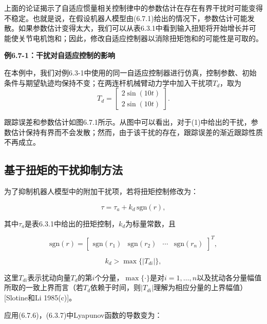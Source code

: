 \documentclass[12pt,a4paper]{ctexart}
\begin{document}
上面的论证揭示了自适应惯量相关控制律中的参数估计在存在有界干扰时可能变得不稳定。也就是说，在假设机器人模型由(6.7.1)给出的情况下，参数估计可能发散。如果参数估计变得太大，我们可以从表6.3.1中看到输入扭矩将开始增长并可能使关节电机饱和；因此，修改自适应控制器以消除扭矩饱和的可能性是可取的。

\textbf{例6.7-1：干扰对自适应控制的影响}

在本例中，我们对例6.3-1中使用的同一自适应控制器进行仿真，控制参数、初始条件与期望轨迹均保持不变；在两连杆机械臂动力学中加入干扰项$T_d$，取为
\begin{equation}\tag{1}
T_d = \begin{bmatrix} 2\sin(10t) \\ 2\sin(10t) \end{bmatrix}.
\end{equation}

跟踪误差和参数估计如图6.7.1所示。从图中可以看出，对于(1)中给出的干扰，参数估计保持有界而不会发散；然而，由于该干扰的存在，跟踪误差的渐近跟踪性质不再成立。

\subsection*{基于扭矩的干扰抑制方法}

为了抑制机器人模型中的附加干扰项，若将扭矩控制修改为：

\begin{equation}\label{eq:6.7.6}
\tau = \tau_a + k_d\, \text{sgn}(r),
\end{equation}

其中$\tau_a$是表6.3.1中给出的扭矩控制，$k_d$为标量常数，且

\begin{equation}\label{eq:6.7.7}
\text{sgn}(r) = \begin{bmatrix} \text{sgn}(r_1) & \text{sgn}(r_2) & \cdots & \text{sgn}(r_n) \end{bmatrix}^T,
\end{equation}

\begin{equation}\label{eq:6.7.8}
k_d > \max\{|T_{di}|\},
\end{equation}

这里$T_{di}$表示扰动向量$T_d$的第$i$个分量，$\max\{\cdot\}$是对$i=1,\ldots,n$以及扰动各分量幅值所取的一致上界而言（若$T_d$依赖于时间，则$|T_{di}|$理解为相应分量的上界幅值）[Slotine和Li 1985(c)]。

应用(6.7.6)，(6.3.7)中Lyapunov函数的导数变为：
\end{document}
